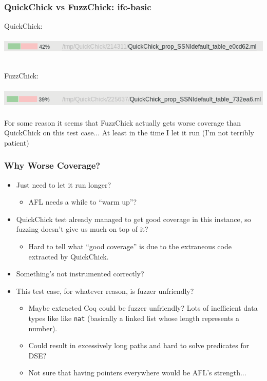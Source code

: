 \documentclass{beamer}
\begin{document}
\begin{frame}
  \frametitle{QuickChick vs FuzzChick: ifc-basic}

  QuickChick: \\~\\

  \includegraphics[width=\textwidth]{ifcquickchick.png} \\~\\

  \pause

  FuzzChick: \\~\\

  \includegraphics[width=\textwidth]{ifcfuzzchick.png} \\~\\
  
  For some reason it seems that FuzzChick actually gets worse coverage
  than QuickChick on this test case... At least in the time I let it run (I'm not
  terribly patient)
\end{frame}

\begin{frame}
  \frametitle{Why Worse Coverage?}

  \begin{itemize}
  \item Just need to let it run longer?
    \begin{itemize}
    \item AFL needs a while to ``warm up''?
    \end{itemize}
    \pause
  \item QuickChick test already managed to get good coverage in this
    instance, so fuzzing doesn't give us much on top of it?
    \begin{itemize}
    \item Hard to tell what ``good coverage'' is due to the extraneous
      code extracted by QuickChick.
    \end{itemize}
    \pause
  \item Something's not instrumented correctly?
    \pause
  \item This test case, for whatever reason, is fuzzer unfriendly?
    \begin{itemize}
    \item Maybe extracted Coq could be fuzzer unfriendly? Lots of
      inefficient data types like like \texttt{nat} (basically a
      linked list whose length represents a number).
    \item Could result in excessively long paths and hard to solve
      predicates for DSE?
    \item Not sure that having pointers everywhere would be AFL's
      strength...
    \end{itemize}
  \end{itemize}
\end{frame}
\end{document}
